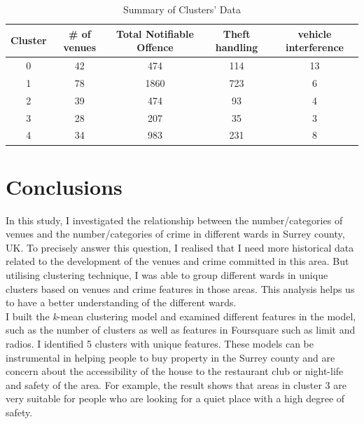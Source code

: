 \documentclass[12pt]{article}
\begin{document}
 \begin{table}[ht]
\caption{Summary of Clusters' Data} %
\centering %
\begin{tabular}{c c c c c } %
\hline\hline %
Cluster & \# of venues & Total Notifiable Offence &  Theft handling& vehicle interference  \\ [0.5ex] %
\hline %
0 &  42  &  474 &  114& 13\\ %
1 &78 & 1860 & 723&6\\
2 & 39  & 474 &  93&4\\
3 &  28 & 207 &35&3 \\
4 &  34 & 983 & 231&8\\ [1ex] %
\hline %
\end{tabular}
\label{tb:SummaryofClusters} %
\end{table}

\section{Conclusions}\label{conclusions}
 In this study, I investigated the relationship between the number/categories of venues and the number/categories of crime in different wards in Surrey county, UK. To precisely answer this question, I realised that I need more historical data related to the development of the venues and crime committed in this area. But utilising clustering technique, I was able to group different wards in unique clusters based on venues and crime features in those areas. This analysis helps us to have a better understanding of the different wards. 
\\\indent I built the \emph{k}-mean clustering model and examined different features in the model, such as the number of clusters as well as features in Foursquare such as limit and radios. I identified 5 clusters with unique features. These models can be instrumental in helping people to buy property in the Surrey county and are concern about the accessibility of the house to the restaurant club or night-life and safety of the area. For example, the result shows that areas in cluster 3 are very suitable for people who are looking for a quiet place with a high degree of safety. 
\end{document}
